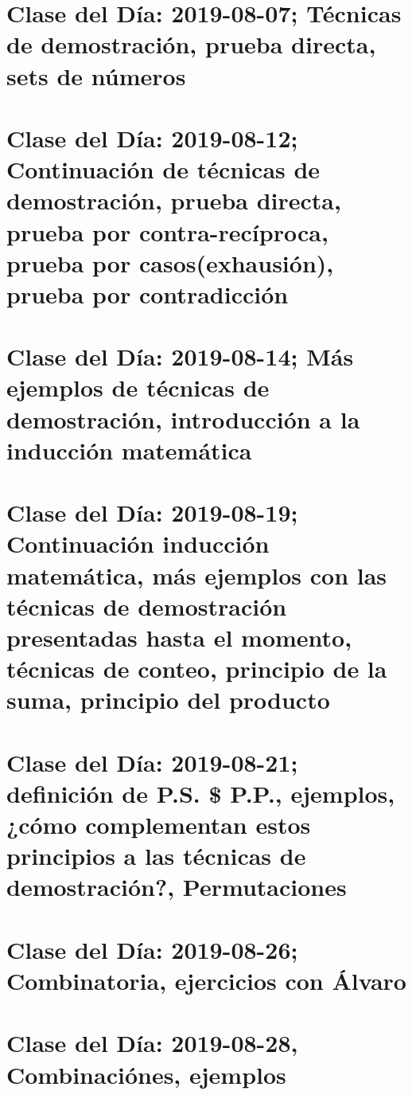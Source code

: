 \documentclass[openany]{book}
\begin{document}
\chapter{Clase del Día: 2019-08-07; Técnicas de demostración, prueba directa, sets de números}



\chapter{Clase del Día: 2019-08-12; Continuación de técnicas de demostración, prueba directa, prueba por contra-recíproca, prueba por casos(exhausión), prueba por contradicción}



\chapter{Clase del Día: 2019-08-14; Más ejemplos de técnicas de demostración, introducción a la \textbf{inducción matemática}}



\chapter{Clase del Día: 2019-08-19; Continuación inducción
matemática, más ejemplos con las técnicas de demostración presentadas hasta el momento, \textbf{técnicas de conteo}, principio de la suma, principio del producto}



\chapter{Clase del Día: 2019-08-21; definición de P.S. \$ P.P., ejemplos, ¿cómo complementan estos principios a las técnicas de demostración?, \textbf{Permutaciones}}


\chapter{Clase del Día: 2019-08-26; Combinatoria, ejercicios con Álvaro}


\chapter{Clase del Día: 2019-08-28, Combinaciónes, ejemplos}

\end{document}
